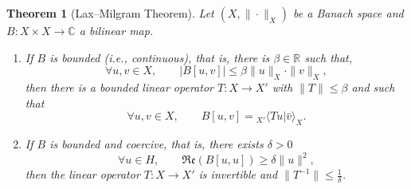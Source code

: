 \documentclass[a4paper,9pt]{amsart}
\newcommand{\frk}[1]{\mathfrak{#1}}
\newcommand{\R}{\mathbb{R}}	%
\newcommand{\C}{\mathbb{C}}	%
\newcommand{\real}{\frk{Re}}
\theoremstyle{plain}
\newtheorem{theorem}[proposition]{Theorem}
\theoremstyle{definition}
\theoremstyle{remark}
\begin{document}
\begin{theorem}[Lax--Milgram Theorem]\label{thm68208c88}
	Let $(X,\|\cdot\|_X)$ be a Banach space and $B:X\times X\to\C$ a bilinear map.
	\begin{enumerate}
	\item	
	If $B$ is bounded (i.e., continuous), that is, there is $\beta\in\R$ such that, 
	\begin{equation}\label{eq68208d6c}
		\forall u,v\in X,\qquad
		|B[u,v]| \le \beta \|u\|_X \cdot \|v\|_X ,
	\end{equation}
	then there is a bounded linear operator $T:X\to X'$ with $\|T\|\le\beta$ and such that 
	\begin{equation}\label{eq68208e5c}
		\forall u,v\in X,\qquad
		B[u,v] = {}_{X'}{\langle} Tu|\bar v \rangle_X  .
	\end{equation}
	\item	
	If $B$ is bounded and coercive, that is, there exists $\delta>0$ 
	\begin{equation}\label{eq68208d7d}
		\forall u\in H,\qquad
		\real(B[u,u])\ge\delta\|u\|^2 ,
	\end{equation}
	then the linear operator $T:X\to X'$ is invertible and $\|T^{-1}\|\le \frac1\delta$.
	\end{enumerate}
\end{theorem}
\end{document}
